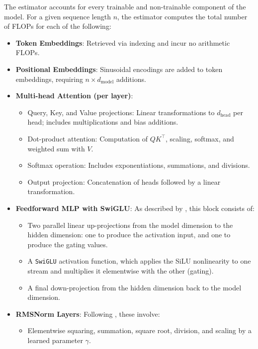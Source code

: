 \documentclass[a4paper,12pt]{article}
\begin{document}
The estimator accounts for every trainable and non-trainable component of the model. For a given sequence length $n$, the estimator computes the total number of FLOPs for each of the following:

\begin{itemize}
  \item \textbf{Token Embeddings}: Retrieved via indexing and incur no arithmetic FLOPs.
  
  \item \textbf{Positional Embeddings}: Sinusoidal encodings are added to token embeddings, requiring $n \times d_{\text{model}}$ additions.

  \item \textbf{Multi-head Attention (per layer)}:
  \begin{itemize}
    \item Query, Key, and Value projections: Linear transformations to $d_{\text{head}}$ per head; includes multiplications and bias additions.
    \item Dot-product attention: Computation of $QK^\top$, scaling, softmax, and weighted sum with $V$.
    \item Softmax operation: Includes exponentiations, summations, and divisions.
    \item Output projection: Concatenation of heads followed by a linear transformation.
  \end{itemize}

  \item \textbf{Feedforward MLP with SwiGLU}: As described by \citet{shazeer2020glu}, this block consists of:
  \begin{itemize}
    \item Two parallel linear up-projections from the model dimension to the hidden dimension: one to produce the activation input, and one to produce the gating values.
    \item A \texttt{SwiGLU} activation function, which applies the SiLU nonlinearity to one stream and multiplies it elementwise with the other (gating).
    \item A final down-projection from the hidden dimension back to the model dimension.
  \end{itemize}  

  \item \textbf{RMSNorm Layers}: Following \citet{zhang2019root}, these involve:
  \begin{itemize}
    \item Elementwise squaring, summation, square root, division, and scaling by a learned parameter $\gamma$.
  \end{itemize}


\end{itemize}
\end{document}
